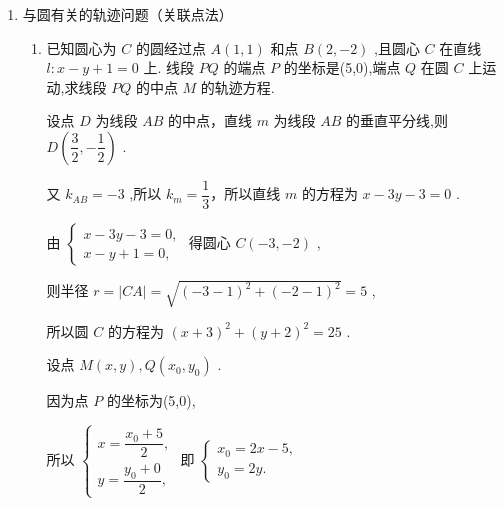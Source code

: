 \begin{enumerate}
\begin{enumerate}
\begin{jieda}
            化简得 ${\left( x - \dfrac{1}{3}\right) }^{2} + {y}^{2} = \dfrac{16}{9}$ ,
            可转化为直线 ${3x} + {4y} - a = 0$ 与圆 ${\left( x - \dfrac{1}{3}\right) }^{2} + {y}^{2} = \dfrac{16}{9}$ 有公共点

            所以 $d = \dfrac{\left| 1 - a\right| }{5} \leq  \dfrac{4}{3}$ ,解得 $- \dfrac{17}{3} \leq  a \leq  \dfrac{23}{3}$ . 所以 $a$ 的最大值为 $\dfrac{23}{3}$.
        \end{jieda}
        
    \end{enumerate}
    
    \item 与圆有关的轨迹问题（关联点法）
    \begin{enumerate}
        
        \item 已知圆心为 $C$ 的圆经过点 $A\left( {1,1}\right)$ 和点 $B\left( {2, - 2}\right)$ ,且圆心 $C$ 在直线 $l : x - y + 1 = 0$ 上. 线段 ${PQ}$ 的端点 $P$ 的坐标是(5,0),端点 $Q$ 在圆 $C$ 上运动,求线段 ${PQ}$ 的中点 $M$ 的轨迹方程.
        \begin{jieda}
            设点 $D$ 为线段 ${AB}$ 的中点，直线 $m$ 为线段 ${AB}$ 的垂直平分线,则 $D\left( {\dfrac{3}{2}, - \dfrac{1}{2}}\right)$ .
            
            又 ${k}_{AB} =  - 3$ ,所以 ${k}_{m} = \dfrac{1}{3}$，所以直线 $m$ 的方程为 $x - {3y} - 3 = 0$ .
            
            由 $\left\{  \begin{array}{l} x - {3y} - 3 = 0, \\  x - y + 1 = 0, \end{array}\right.$ 得圆心 $C\left( {-3, - 2}\right)$ ,
            
            则半径 $r = \left| {CA}\right|  = \sqrt{{\left( -3 - 1\right) }^{2} + {\left( -2 - 1\right) }^{2}} = 5$ ,
            
            所以圆 $C$ 的方程为 ${\left( x + 3\right) }^{2} + {\left( y + 2\right) }^{2} = {25}$ .
            
            设点 $M\left( {x,y}\right) ,Q\left( {{x}_{0},{y}_{0}}\right)$ .
            
            因为点 $P$ 的坐标为(5,0),
            
            所以 $\left\{  {\begin{array}{l} x = \dfrac{{x}_{0} + 5}{2}, \\  y = \dfrac{{y}_{0} + 0}{2}, \end{array}\text{ 即 }\left\{  \begin{array}{l} {x}_{0} = {2x} - 5, \\  {y}_{0} = {2y}. \end{array}\right. }\right.$
            

\end{jieda}
\end{enumerate}
\end{enumerate}
